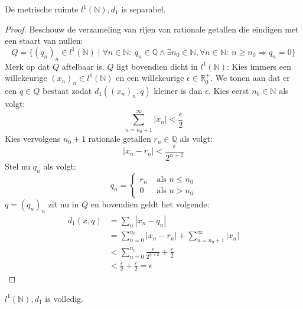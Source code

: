 \documentclass[main.tex]{subfiles}
\begin{document}
\begin{vb}
  De metrische ruimte $l^{1}(\mathbb{N}),d_{1}$ is separabel.
  
  \begin{proof}
    Beschouw de verzameling van rijen van rationale getallen die eindigen met een staart van nullen:\\
    \[ Q = \{ (q_{n})_{n} \in l^{1}(\mathbb{N}) \mid \forall n\in \mathbb{N}:\ q_{n}\in \mathbb{Q} \wedge \exists n_{0}\in \mathbb{N}, \forall n\in \mathbb{N}:\ n \ge n_{0} \Rightarrow q_{n} = 0 \} \]
    Merk op dat $Q$ aftelbaar is.
    $Q$ ligt bovendien dicht in $l^{1}(\mathbb{N})$:
    Kies immers een willekeurige $(x_{n})_{n}\in l^{1}(\mathbb{N})$ en een willekeurige $\epsilon \in \mathbb{R}_{0}^{+}$.
    We tonen aan dat er een $q\in Q$ bestaat zodat $d_{1}((x_{n})_{n},q)$ kleiner is dan $\epsilon$.
    Kies eerst $n_{0}\in \mathbb{N}$ als volgt:
    \[ \sum_{n=n_{0}+1}^{\infty}|x_{n}| < \frac{\epsilon}{2} \]
    Kies vervolgens $n_{0}+1$ rationale getallen $r_{n}\in \mathbb{Q}$ als volgt:
    \[ |x_{n}-r_{n}| < \frac{\epsilon}{2^{n+2}} \]
    Stel nu $q_{n}$ als volgt:
    \[
    q_{n} =
    \begin{cases}
      r_{n} &\text{ als } n \le n_{0}\\
      0 &\text{ als } n > n_{0}
    \end{cases}
    \]
    $q=(q_{n})_{n}$ zit nu in $Q$ en bovendien geldt het volgende:
    \begin{align*}
      d_{1}(x,q)
      &= \sum_{n}|x_{n}-q_{n}|\\
      &= \sum_{n=0}^{n_{0}}|x_{n}-r_{n}| + \sum_{n=n_{0}+1}^{\infty}|x_{n}|\\
      &< \sum_{n=0}^{n_{0}}\frac{\epsilon}{2^{n+2}} + \frac{\epsilon}{2}\\
      &< \frac{\epsilon}{2} + \frac{\epsilon}{2} = \epsilon
    \end{align*}
  \end{proof}
\end{vb}

\begin{vb}
  $l^{1}(\mathbb{N}),d_{1}$ is volledig.
\end{vb}
\end{document}
